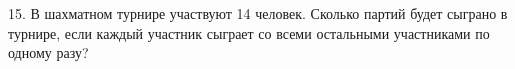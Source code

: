 15. В шахматном турнире участвуют 14 человек. Сколько партий будет сыграно в турнире, если каждый участник сыграет со всеми остальными участниками по одному разу?\\
